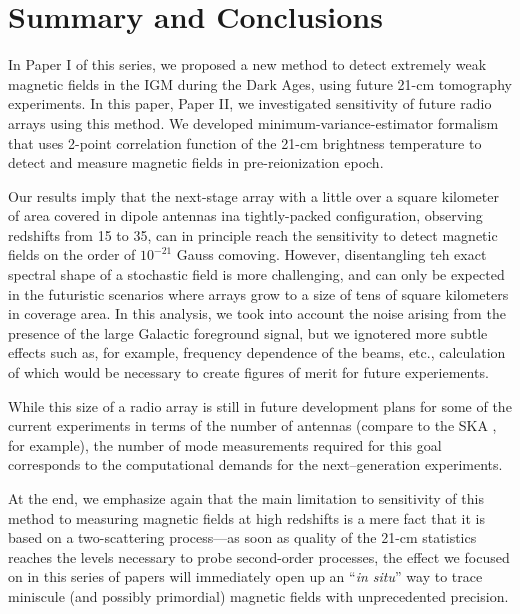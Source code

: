 \section{Summary and Conclusions}
\label{sec:conclusions}

In Paper I of this series, we proposed a new method to detect extremely weak magnetic fields in the IGM during the Dark Ages, using future 21-cm tomography experiments. In this paper, Paper II, we investigated sensitivity of future radio arrays using this method. We developed minimum-variance-estimator formalism that uses 2-point correlation function of the 21-cm brightness temperature to detect and measure magnetic fields in pre-reionization epoch. 

Our results imply that the next-stage array with a little over a square kilometer of area covered in dipole antennas ina  tightly-packed configuration, observing redshifts from 15 to 35, can in principle reach the sensitivity to detect magnetic fields on the order of $10^{-21}$ Gauss comoving. However, disentangling teh exact spectral shape of a stochastic field is more challenging, and can only be expected in the futuristic scenarios where arrays grow to a size of tens of square kilometers in coverage area. In this analysis, we took into account the noise arising from the presence of the large Galactic foreground signal, but we ignotered more subtle effects such as, for example, frequency dependence of the beams, etc., calculation of which would be necessary to create figures of merit for future experiements. 

While this size of a radio array is still in future development plans for some of the current experiments in terms of the number of antennas (compare to the SKA \cite{2008arXiv0802.1727C}, for example), the number of mode measurements required for this goal corresponds to the computational demands for the next--generation  experiments. 

At the end, we emphasize again that the main limitation to sensitivity of this method to measuring magnetic fields at high redshifts is a mere fact that it is based on a two-scattering process---as soon as quality of the 21-cm statistics reaches the levels necessary to probe second-order processes, the effect we focused on in this series of papers will immediately open up an ``\textit{in situ}'' way to trace miniscule (and possibly primordial) magnetic fields with unprecedented precision. 

  